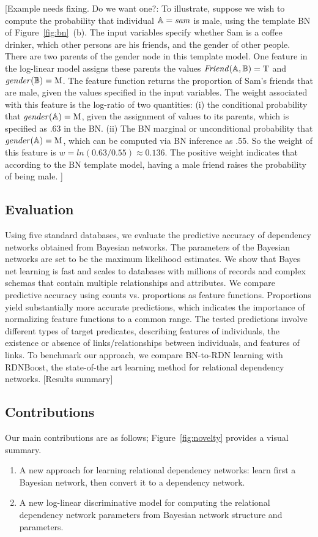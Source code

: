 \documentclass[twoside,11pt]{article}
\begin{document}
[Example needs fixing. Do we want one?: To illustrate, suppose we wish to compute the probability that individual $\mathbb{A} = \it{sam}$ is male, using the template BN of Figure~\ref{fig:bn}~(b).  The input variables specify whether Sam is a coffee drinker, which other persons are his friends, and the gender of other people. There are two parents of the gender node in this template model. One feature in the log-linear model assigns these parents the values $\it{Friend}(\mathbb{A},\mathbb{B}) = \mathrm{T}$ and $\it{gender}(\mathbb{B}) = \mathrm{M}$. The feature function returns the proportion of Sam's friends that are male, given the values specified in the input variables. The weight associated with this feature is the log-ratio of two quantities: (i) the conditional probability that $\it{gender}(\mathbb{A}) = \mathrm{M}$, given the assignment of values to its parents, which is specified as .63 in the BN. (ii) The BN marginal or unconditional probability that $\it{gender}(\mathbb{A}) = \mathrm{M}$, which can be computed via BN inference as .55. So the weight of this feature is $w = ln(0.63/0.55) \approx 0.136$. The positive weight indicates that according to the BN template model, having a male friend raises the probability of being male. ]

  
\subsection{Evaluation} Using five standard databases, we evaluate the predictive accuracy of dependency networks obtained from Bayesian networks. The parameters of the Bayesian networks are set to be the maximum likelihood estimates. We show that Bayes net learning is fast and scales to databases with millions of records and complex schemas that contain multiple relationships and attributes. We compare predictive accuracy using counts vs. proportions as feature functions.  Proportions yield substantially more accurate predictions, which indicates the importance of normalizing feature functions to a common range. The tested predictions involve different types of target predicates, describing features of individuals,  the existence or absence of links/relationships between individuals, and features of links. To benchmark our approach, we compare BN-to-RDN learning with RDNBoost, the state-of-the art learning method for relational dependency networks. [Results summary] 



\subsection{Contributions} 
Our main contributions are as follows; Figure~\ref{fig:novelty} provides a visual summary.  
\begin{enumerate}
\item A new approach for learning relational dependency networks: learn first a Bayesian network, then convert it to a dependency network.
\item A new log-linear discriminative model for computing the relational dependency network parameters from Bayesian network structure and parameters.
\end{enumerate}
\end{document}
